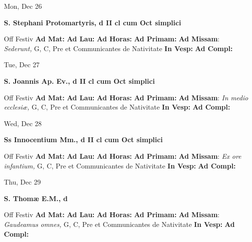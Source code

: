 \documentclass[10pt]{article}
\begin{document}
\begin{minipage}{3.5in}
\vspace{2em}\begin{center}
Mon, Dec 26
\end{center}\textbf{ \large S. Stephani Protomartyris, \textnormal{\normalsize d II cl cum Oct simplici}}
\begin{justify}
Off Festiv
\textbf{Ad Mat: }
\textbf{Ad Lau: }
\textbf{Ad Horas: }
\textbf{Ad Primam: }
\textbf{Ad Missam}: \textit{Sederunt,} G, C, Pre et Communicantes de Nativitate
\textbf{In Vesp: }
\textbf{Ad Compl: }\end{justify}
\end{minipage}



\begin{minipage}{3.5in}
\vspace{2em}\begin{center}
Tue, Dec 27
\end{center}\textbf{ \large S. Joannis Ap. Ev., \textnormal{\normalsize d II cl cum Oct simplici}}
\begin{justify}
Off Festiv
\textbf{Ad Mat: }
\textbf{Ad Lau: }
\textbf{Ad Horas: }
\textbf{Ad Primam: }
\textbf{Ad Missam}: \textit{In medio ecclesiæ,} G, C, Pre et Communicantes de Nativitate
\textbf{In Vesp: }
\textbf{Ad Compl: }\end{justify}
\end{minipage}



\begin{minipage}{3.5in}
\vspace{2em}\begin{center}
Wed, Dec 28
\end{center}\textbf{ \large Ss Innocentium Mm., \textnormal{\normalsize d II cl cum Oct simplici}}
\begin{justify}
Off Festiv
\textbf{Ad Mat: }
\textbf{Ad Lau: }
\textbf{Ad Horas: }
\textbf{Ad Primam: }
\textbf{Ad Missam}: \textit{Ex ore infantium,} G, C, Pre et Communicantes de Nativitate
\textbf{In Vesp: }
\textbf{Ad Compl: }\end{justify}
\end{minipage}



\begin{minipage}{3.5in}
\vspace{2em}\begin{center}
Thu, Dec 29
\end{center}\textbf{ \large S. Thomæ E.M., \textnormal{\normalsize d}}
\begin{justify}
Off Festiv
\textbf{Ad Mat: }
\textbf{Ad Lau: }
\textbf{Ad Horas: }
\textbf{Ad Primam: }
\textbf{Ad Missam}: \textit{Gaudeamus omnes,} G, C, Pre et Communicantes de Nativitate
\textbf{In Vesp: }
\textbf{Ad Compl: }\end{justify}
\end{minipage}
\end{document}

